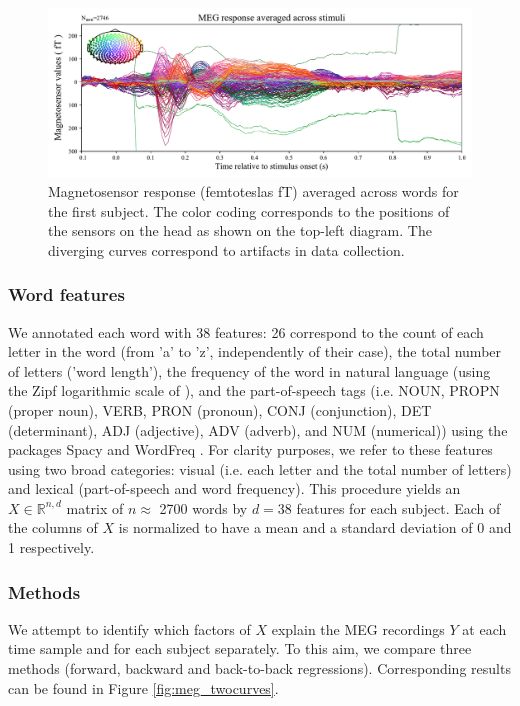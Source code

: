 \begin{figure}
  \centering
  \includegraphics[width=\textwidth, trim=0cm 0cm 0cm 0cm, clip=True]{figures/meg_sensors.pdf}
  \caption{Magnetosensor response (femtoteslas fT) averaged across words for the first subject. The color coding corresponds to the positions of the sensors on the head as shown on the top-left diagram. The diverging curves correspond to artifacts in data collection.}
  \label{fig:megavg}
\end{figure}

\subsubsection{Word features} We annotated each word with 38 features: 26
correspond to the count of each letter in the word (from 'a' to 'z',
independently of their case), the total number of letters ('word length'), the
frequency of the word in natural language (using the Zipf logarithmic scale
of \citep{van2014subtlex}), and the part-of-speech tags (i.e. NOUN, PROPN (proper
noun), VERB, PRON (pronoun), CONJ (conjunction), DET (determinant), ADJ
(adjective), ADV (adverb), and NUM (numerical)) using the packages Spacy
\citep{spacy2} and WordFreq \citep{speerwordfreq}. For clarity purposes, we refer to these
features using two broad categories: visual (i.e. each letter and the total
number of letters) and lexical (part-of-speech and word frequency).  This
procedure yields an $X \in \mathbb{R}^{n, d}$ matrix of $n\approx$ 2700 words by
$d=38$ features for each subject. Each of the columns of $X$ is normalized to
have a mean and a standard deviation of 0 and 1 respectively.

\subsubsection{Methods}

We attempt to identify which factors of $X$ explain the MEG
recordings $Y$ at each time sample and for each subject separately. To this aim,
we compare three methods (forward, backward and back-to-back
regressions). Corresponding results can be found in Figure \ref{fig:meg_twocurves}.


